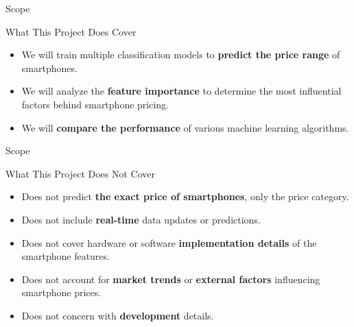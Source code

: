 \documentclass[14pt, aspectratio=169]{beamer}
\begin{document}
\begin{frame}{Scope}
  \begin{block}{What This Project Does Cover}
  \begin{itemize}
	\setlength\itemsep{0.75em}
    \item<1-> We will train multiple classification models to \textbf{predict the price range} of smartphones.
    \item<2-> We will analyze the \textbf{feature importance} to determine the most influential factors behind smartphone pricing. 
    \item<3-> We will \textbf{compare the performance} of various machine learning algorithms.
  \end{itemize}
  \end{block}
\end{frame}

\begin{frame}{Scope}
  \begin{block}{What This Project Does Not Cover}
    \begin{itemize}
      \item<1-> Does not predict \textbf{the exact price of smartphones}, only the price category.
      \item<2-> Does not include \textbf{real-time} data updates or predictions.
      \item<3-> Does not cover hardware or software \textbf{implementation details} of the smartphone features.
      \item<4-> Does not account for \textbf{market trends} or \textbf{external factors} influencing smartphone prices.
      \item<4-> Does not concern with \textbf{development} details.
    \end{itemize}
  \end{block}
\end{frame}
\end{document}
